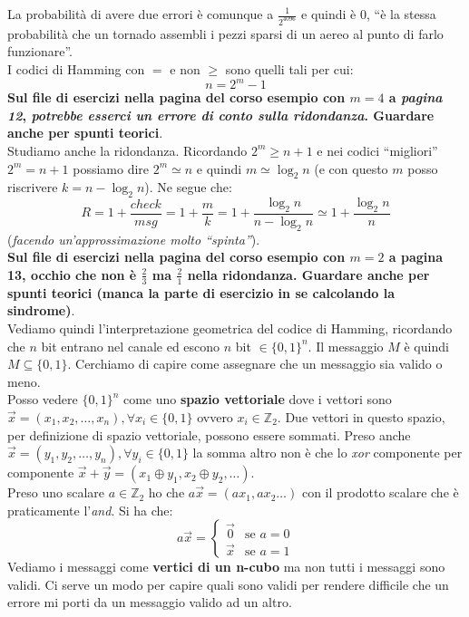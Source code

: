 \documentclass[a4paper,12pt, oneside]{book}
\begin{document}
La probabilità di avere due errori è comunque a $\frac{1}{2^{4096}}$ e quindi è
0, ``è la stessa probabilità che un tornado assembli i pezzi sparsi di un aereo
al punto di farlo funzionare''.\\
I codici di Hamming con $=$ e non $\geq$ sono quelli tali per cui:
\[n=2^m-1\]
\textbf{Sul file di esercizi nella pagina del corso esempio con $m=4$ a
  \textit{pagina 12}, \textit{potrebbe esserci un errore di conto sulla
    ridondanza}. Guardare anche per spunti teorici}.\\ 
Studiamo anche la ridondanza. Ricordando $2^m\geq n+1$ e nei codici ``migliori''
$2^m=n+1$ possiamo dire $2^m\simeq n$ e quindi $m\simeq \log_2 n$ (e con questo
$m$ posso riscrivere $k= n-\log_2n$). Ne segue che:
\[R=1+\frac{check}{msg}=1+\frac{m}{k}=1+\frac{\log_2 n}{n-\log_2n}\simeq
  1+\frac{\log_2n}{n}\]
(\textit{facendo un'approssimazione molto ``spinta''}).\\
\textbf{Sul file di esercizi nella pagina del corso esempio con $m=2$ a pagina
  13, occhio che non è $\frac{2}{3}$ ma $\frac{2}{1}$ nella ridondanza. Guardare
  anche per spunti teorici (manca la parte di esercizio in se calcolando la
  sindrome)}.\\ 
Vediamo quindi l'interpretazione geometrica del codice di Hamming, ricordando
che $n$ bit entrano nel canale ed escono $n$ bit $\in \{0,1\}^n$. Il messaggio
$M$ è quindi $M\subseteq \{0,1\}$. Cerchiamo di capire come assegnare che un
messaggio sia valido o meno.\\
Posso vedere $\{0,1\}^n$ come uno \textbf{spazio vettoriale} dove i vettori sono
$\vec{x}=(x_1,x_2,\ldots,x_n), \forall x_i\in\{0,1\}$ ovvero
$x_i\in\mathbb{Z}_2$. Due vettori in questo spazio, per definizione di spazio
vettoriale, possono essere sommati. Preso 
anche $\vec{x}=(y_1,y_2,\ldots,y_n), \forall y_i\in\{0,1\}$ la somma altro non
è che lo \textit{xor} componente per componente $\vec{x}+\vec{y}=(x_1\oplus y_1,
x_2\oplus y_2,\ldots)$. \\
Preso uno scalare $a\in \mathbb{Z}_2$ ho che $a\vec{x}=(ax_1,ax_2\ldots)$ con il
prodotto scalare che è praticamente l'\textit{and}. Si ha che:
\[a\vec{x}=
  \begin{cases}
    \vec{0} &\mbox{se } a=0\\
    \vec{x} &\mbox{se } a=1
  \end{cases}
\]
Vediamo i messaggi come \textbf{vertici di un n-cubo} ma non tutti i messaggi
sono validi. Ci serve un modo per capire quali sono validi per rendere difficile
che un errore mi porti da un messaggio valido ad un altro.
\end{document}
